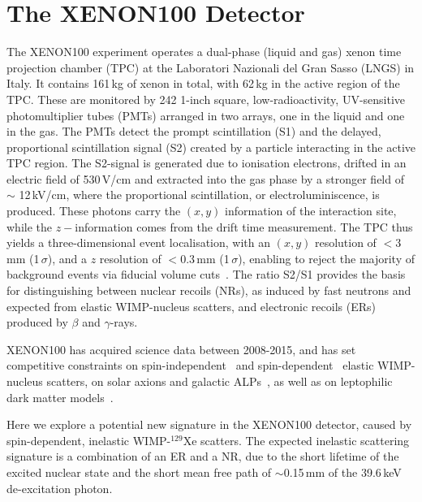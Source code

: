 \section{The XENON100 Detector}
\label{sec:xenon100}

The XENON100 experiment operates a dual-phase (liquid and gas) xenon time projection chamber (TPC) at the Laboratori Nazionali 
del Gran Sasso (LNGS) in Italy. It contains 161\,kg of xenon in total,  with  62\,kg in the active region of the TPC. These 
are monitored by 242 1-inch square, low-radioactivity, UV-sensitive photomultiplier tubes (PMTs) arranged in two arrays, one in the liquid 
and one in the gas. The PMTs detect the prompt scintillation (S1) and the delayed, proportional scintillation signal (S2) 
created by a particle interacting in the active TPC region. The S2-signal is generated due to ionisation electrons, drifted 
in an electric field of 530\,V/cm and extracted into the gas phase by a stronger field of $\sim$ 12\,kV/cm, where the proportional scintillation, or electroluminiscence, 
is produced. These photons carry the $(x,y)$ information of the interaction site, while the $z-$information comes from the drift time measurement. The TPC 
thus yields a three-dimensional event localisation, with an $(x,y)$ resolution of $<$3\,mm (1\,$\sigma$), and a $z$ resolution of  $<$0.3\,mm (1\,$\sigma$), enabling to reject the majority of background events via fiducial volume cuts~\cite{Aprile:2011dd}. The ratio S2/S1 provides the basis for distinguishing between nuclear recoils (NRs), as induced by fast neutrons and expected from elastic WIMP-nucleus scatters, and electronic recoils (ERs) produced by $\beta$ and $\gamma$-rays. 

XENON100 has acquired science data between 2008-2015, and has set competitive constraints on spin-independent~\cite{Aprile:2012nq,Aprile:2016swn} 
and spin-dependent~\cite{Aprile:2013doa,Aprile:2016swn} elastic WIMP-nucleus 
scatters, on solar axions and galactic ALPs~\cite{Aprile:2014eoa}, as well as on leptophilic dark matter models~\cite{Aprile:2015ade,Aprile:2015ibr,Aprile:2017yea}.

Here we explore a potential new signature in the XENON100 detector, caused by spin-dependent, inelastic WIMP-$^{129}$Xe scatters. The expected  
inelastic scattering signature is a combination of an ER and a NR, due to the short lifetime of the excited nuclear state and  the short mean free path of $\sim$0.15\,mm of the 39.6\,keV de-excitation photon. 


